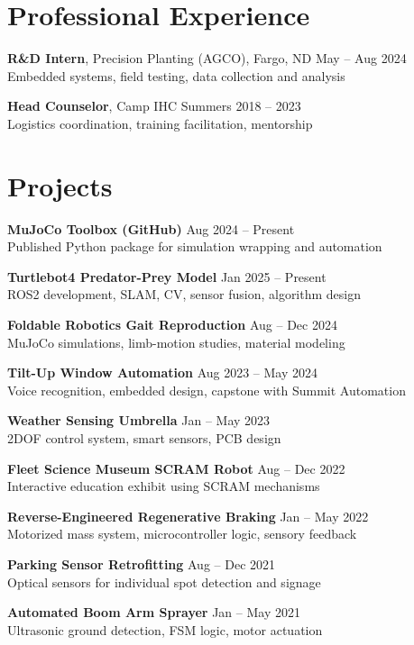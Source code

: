 \documentclass[11pt]{article}
\begin{document}
\section*{Professional Experience}
\textbf{R\&D Intern}, Precision Planting (AGCO), Fargo, ND \hfill May -- Aug 2024\\
Embedded systems, field testing, data collection and analysis

\textbf{Head Counselor}, Camp IHC \hfill Summers 2018 -- 2023\\
Logistics coordination, training facilitation, mentorship

\section*{Projects}
\textbf{MuJoCo Toolbox (GitHub)} \hfill Aug 2024 -- Present\\
Published Python package for simulation wrapping and automation

\textbf{Turtlebot4 Predator-Prey Model} \hfill Jan 2025 -- Present\\
ROS2 development, SLAM, CV, sensor fusion, algorithm design

\textbf{Foldable Robotics Gait Reproduction} \hfill Aug -- Dec 2024\\
MuJoCo simulations, limb-motion studies, material modeling

\textbf{Tilt-Up Window Automation} \hfill Aug 2023 -- May 2024\\
Voice recognition, embedded design, capstone with Summit Automation

\textbf{Weather Sensing Umbrella} \hfill Jan -- May 2023\\
2DOF control system, smart sensors, PCB design

\textbf{Fleet Science Museum SCRAM Robot} \hfill Aug -- Dec 2022\\
Interactive education exhibit using SCRAM mechanisms

\textbf{Reverse-Engineered Regenerative Braking} \hfill Jan -- May 2022\\
Motorized mass system, microcontroller logic, sensory feedback

\textbf{Parking Sensor Retrofitting} \hfill Aug -- Dec 2021\\
Optical sensors for individual spot detection and signage

\textbf{Automated Boom Arm Sprayer} \hfill Jan -- May 2021\\
Ultrasonic ground detection, FSM logic, motor actuation
\end{document}
